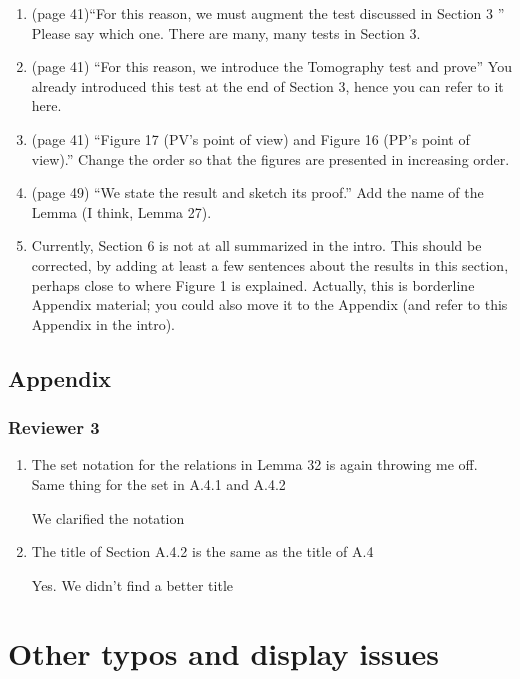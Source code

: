 \documentclass[12pt]{article}
\begin{document}
\begin{enumerate}
\item (page 41)``For this reason, we must
augment the test discussed in Section 3 '' Please say which one. There are many, many tests in Section 3.
\item (page 41) ``For this reason, we introduce the Tomography test and prove'' You already introduced this test at the end of Section 3, hence you can refer to it here.
\item (page 41) ``Figure 17 (PV’s point of view)
and Figure 16 (PP’s point of view).'' Change the order so that the figures are presented in increasing order.
\item (page 49) ``We state the result and sketch its proof.'' Add the name of the Lemma (I think, Lemma 27).
\item Currently, Section 6 is not at all summarized in the intro. This should be corrected, by adding at least a few sentences about the results in this section, perhaps close to where Figure 1 is explained. Actually, this is borderline Appendix material; you could also move it to the Appendix (and refer to this Appendix in the intro).
\end{enumerate}


\subsection*{Appendix}
\subsubsection*{Reviewer 3}
\begin{enumerate}
\item The set notation for the relations in Lemma 32 is again throwing me off. Same thing for the set in A.4.1 and A.4.2

{\color{blue} We clarified the notation} 

\item The title of Section A.4.2 is the same as the title of A.4

{\color{blue} Yes. We didn't find a better title} 

\end{enumerate}



\section*{Other typos and display issues}
\end{document}
